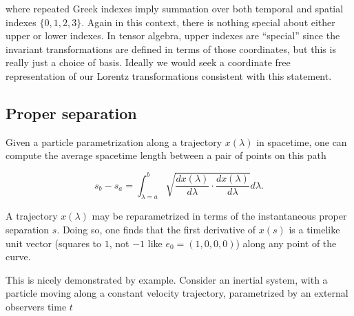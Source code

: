 \documentclass[iop,tighten]{emulateapj}
\begin{document}
where repeated Greek indexes imply summation over both temporal and spatial indexes $\{0, 1, 2, 3\}$.  Again in this context, there is nothing special about either upper or lower indexes.  In tensor algebra, upper indexes are ``special'' since the invariant transformations are defined in terms of those coordinates, but this is really just a choice of basis.  Ideally we would seek a coordinate free representation of our Lorentz transformations consistent with this statement.

\subsection{Proper separation}

Given a particle parametrization along a trajectory $x(\lambda)$ in spacetime, one can compute the average spacetime length between a pair of points on this path

\begin{equation}\label{eqn:grahamSchmidtLorentz:400}
s_b - s_a = \int_{\lambda = a}^b \sqrt{ \frac{d x(\lambda)}{d\lambda} \cdot \frac{d x(\lambda)}{d\lambda} } d\lambda.
\end{equation}

%
%
%

A trajectory $x(\lambda)$ may be reparametrized in terms of the instantaneous proper separation $s$.  Doing so, one finds that the first derivative of $x(s)$ is a timelike unit vector (squares to $1$, not $-1$ like $e_0 = (1, 0, 0, 0)$) along any point of the curve.

This is nicely demonstrated by example.
%
%
Consider an inertial system, with a particle moving along a constant velocity trajectory, parametrized by an external observers time $t$
\end{document}
